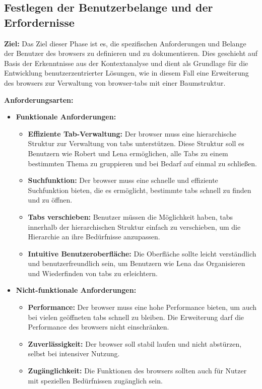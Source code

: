 \subsection{Festlegen der Benutzerbelange und der Erfordernisse}

\textbf{Ziel:} 
Das Ziel dieser Phase ist es, die spezifischen Anforderungen und Belange der Benutzer des \gls{browser}s zu definieren und zu dokumentieren. 
Dies geschieht auf Basis der Erkenntnisse aus der Kontextanalyse und dient als Grundlage für die Entwicklung benutzerzentrierter Lösungen, wie in diesem Fall eine Erweiterung des \gls{browser}s zur Verwaltung von \gls{browser}-\gls{tab}s mit einer Baumstruktur.

\textbf{Anforderungsarten:}
\begin{itemize}
    \item \textbf{Funktionale Anforderungen:}
    \begin{itemize}
        \item \textbf{Effiziente Tab-Verwaltung:} Der \gls{browser} muss eine hierarchische Struktur zur Verwaltung von \gls{tab}s unterstützen. Diese Struktur soll es Benutzern wie Robert und Lena ermöglichen, alle Tabs zu einem bestimmten Thema zu gruppieren und bei Bedarf auf einmal zu schließen.
        \item \textbf{Suchfunktion:} Der \gls{browser} muss eine schnelle und effiziente Suchfunktion bieten, die es ermöglicht, bestimmte \gls{tab}s schnell zu finden und zu öffnen.
        \item \textbf{Tabs verschieben:} Benutzer müssen die Möglichkeit haben, \gls{tab}s innerhalb der hierarchischen Struktur einfach zu verschieben, um die Hierarchie an ihre Bedürfnisse anzupassen.
        \item \textbf{Intuitive Benutzeroberfläche:} Die Oberfläche sollte leicht verständlich und benutzerfreundlich sein, um Benutzern wie Lena das Organisieren und Wiederfinden von \gls{tab}s zu erleichtern.
    \end{itemize}
    \item \textbf{Nicht-funktionale Anforderungen:}
    \begin{itemize}
        \item \textbf{Performance:} Der \gls{browser} muss eine hohe Performance bieten, um auch bei vielen geöffneten \gls{tab}s schnell zu bleiben. Die Erweiterung darf die Performance des \gls{browser}s nicht einschränken.
        \item \textbf{Zuverlässigkeit:} Der \gls{browser} soll stabil laufen und nicht abstürzen, selbst bei intensiver Nutzung.
        \item \textbf{Zugänglichkeit:} Die Funktionen des \gls{browser}s sollten auch für Nutzer mit speziellen Bedürfnissen zugänglich sein.
    \end{itemize}
\end{itemize}

